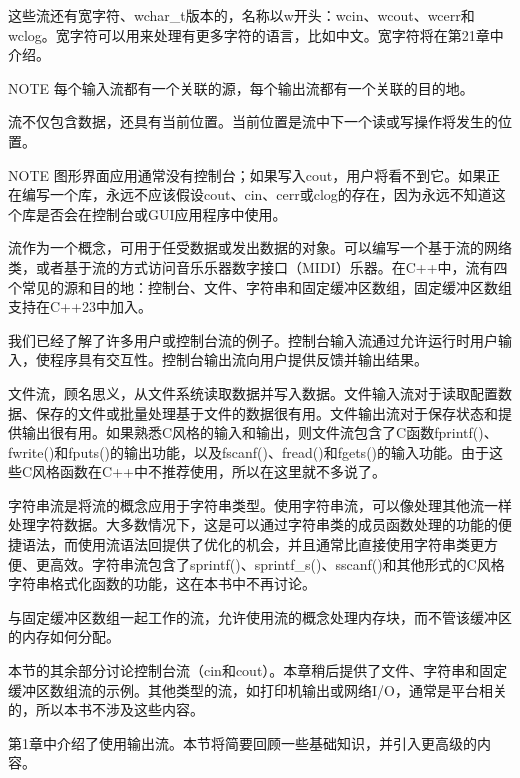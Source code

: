 这些流还有宽字符、wchar\_t版本的，名称以w开头：wcin、wcout、wcerr和wclog。宽字符可以用来处理有更多字符的语言，比如中文。宽字符将在第21章中介绍。

\begin{myNotic}{NOTE}
每个输入流都有一个关联的源，每个输出流都有一个关联的目的地。
\end{myNotic}

流不仅包含数据，还具有当前位置。当前位置是流中下一个读或写操作将发生的位置。

\begin{myNotic}{NOTE}
图形界面应用通常没有控制台；如果写入cout，用户将看不到它。如果正在编写一个库，永远不应该假设cout、cin、cerr或clog的存在，因为永远不知道这个库是否会在控制台或GUI应用程序中使用。
\end{myNotic}


流作为一个概念，可用于任受数据或发出数据的对象。可以编写一个基于流的网络类，或者基于流的方式访问音乐乐器数字接口（MIDI）乐器。在C++中，流有四个常见的源和目的地：控制台、文件、字符串和固定缓冲区数组，固定缓冲区数组支持在C++23中加入。

我们已经了解了许多用户或控制台流的例子。控制台输入流通过允许运行时用户输入，使程序具有交互性。控制台输出流向用户提供反馈并输出结果。

文件流，顾名思义，从文件系统读取数据并写入数据。文件输入流对于读取配置数据、保存的文件或批量处理基于文件的数据很有用。文件输出流对于保存状态和提供输出很有用。如果熟悉C风格的输入和输出，则文件流包含了C函数fprintf()、fwrite()和fputs()的输出功能，以及fscanf()、fread()和fgets()的输入功能。由于这些C风格函数在C++中不推荐使用，所以在这里就不多说了。

字符串流是将流的概念应用于字符串类型。使用字符串流，可以像处理其他流一样处理字符数据。大多数情况下，这是可以通过字符串类的成员函数处理的功能的便捷语法，而使用流语法回提供了优化的机会，并且通常比直接使用字符串类更方便、更高效。字符串流包含了sprintf()、sprintf\_s()、sscanf()和其他形式的C风格字符串格式化函数的功能，这在本书中不再讨论。

与固定缓冲区数组一起工作的流，允许使用流的概念处理内存块，而不管该缓冲区的内存如何分配。

本节的其余部分讨论控制台流（cin和cout）。本章稍后提供了文件、字符串和固定缓冲区数组流的示例。其他类型的流，如打印机输出或网络I/O，通常是平台相关的，所以本书不涉及这些内容。


第1章中介绍了使用输出流。本节将简要回顾一些基础知识，并引入更高级的内容。

